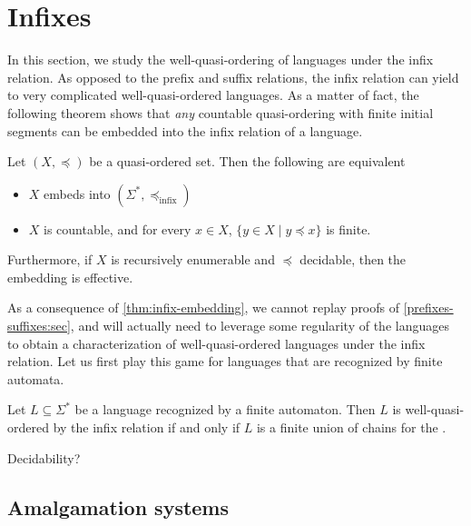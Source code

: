 
\section{Infixes}
\label{infixes:sec}


In this section, we study the well-quasi-ordering of languages under the infix
relation. As opposed to the prefix and suffix relations, the infix relation can
yield to very complicated well-quasi-ordered languages. As a matter of fact,
the following theorem shows that \emph{any} countable quasi-ordering with
finite initial segments can be embedded into the infix relation of a language.

\begin{theorem}
    \label{thm:infix-embedding}
    Let $(X, \preceq)$ be a quasi-ordered set.
    Then the following are equivalent
    \begin{itemize}
        \item $X$ embeds into $(\Sigma^*, \preceq_{\text{infix}})$
        \item $X$ is countable, and for every $x \in X$,
            $\{y \in X \mid y \preceq x\}$ is finite.
    \end{itemize}

    Furthermore, if $X$ is recursively enumerable and $\preceq$ decidable,
    then
    the embedding is effective.
\end{theorem}

As a consequence of \cref{thm:infix-embedding}, we cannot replay proofs of
\cref{prefixes-suffixes:sec}, and will actually need to leverage some
regularity of the languages to obtain a characterization of well-quasi-ordered
languages under the infix relation. Let us first play this game for languages
that are recognized by finite automata.

\begin{theorem}
    \label{thm:infix-finite-automata}
    Let $L \subseteq \Sigma^*$ be a language recognized by a finite automaton.
    Then $L$ is well-quasi-ordered by the infix relation if and only if $L$ is
    a finite union of chains for the .
\end{theorem}

\begin{corollary}
    Decidability?
\end{corollary}

\subsection{Amalgamation systems}

